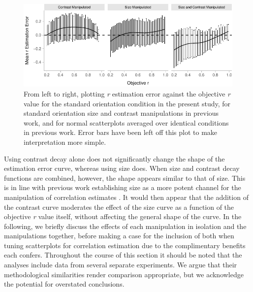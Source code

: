 \documentclass[manuscript, review, anonymous, screen]{acmart}
\begin{document}
\begin{figure}

{\centering \includegraphics[width=1\textwidth,height=\textheight]{size_and_contrast_new_files/figure-pdf/fig-est-multi-exp-1.pdf}

}

\caption{\label{fig-est-multi-exp}From left to right, plotting \emph{r}
estimation error against the objective \emph{r} value for the standard
orientation condition in the present study, for standard orientation
size and contrast manipulations in previous work, and for normal
scatterplots averaged over identical conditions in previous work. Error
bars have been left off this plot to make interpretation more simple.}

\end{figure}

Using contrast decay alone does not significantly change the shape of
the estimation error curve, whereas using size does. When size and
contrast decay functions are combined, however, the shape appears
similar to that of size. This is in line with previous work establishing
size as a more potent channel for the manipulation of correlation
estimates \citep{strain_2023b}. It would then appear that the addition
of the contrast curve moderates the effect of the size curve as a
function of the objective \emph{r} value itself, without affecting the
general shape of the curve. In the following, we briefly discuss the
effects of each manipulation in isolation and the manipulations
together, before making a case for the inclusion of both when tuning
scatterplots for correlation estimation due to the complimentary
benefits each confers. Throughout the course of this section it should
be noted that the analyses include data from several separate
experiments. We argue that their methodological similarities render
comparison appropriate, but we acknowledge the potential for overstated
conclusions.
\end{document}
